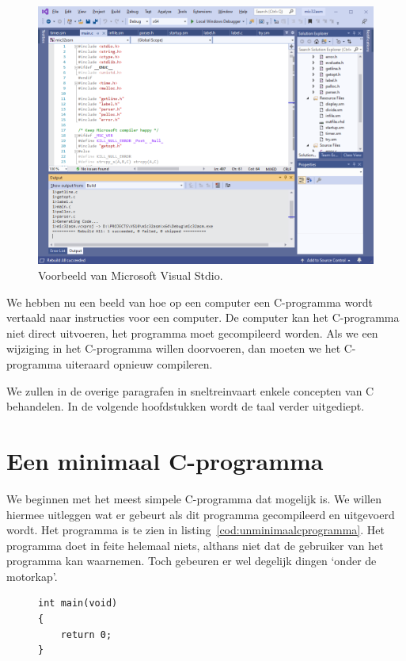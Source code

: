 \begin{figure}[!ht]
\centering
\includegraphics[width=\textwidth]{images/vs2019}
\caption{Voorbeeld van Microsoft Visual Stdio.}
\label{fig:unvs2019}
\end{figure}

We hebben nu een beeld van hoe op een computer een C-programma wordt vertaald naar instructies voor een computer. De computer kan het C-programma niet direct uitvoeren, het programma moet gecompileerd worden. Als we een wijziging in het C-programma willen doorvoeren, dan moeten we het C-programma uiteraard opnieuw compileren.

We zullen in de overige paragrafen in sneltreinvaart enkele concepten van C behandelen. In de volgende hoofdstukken wordt de taal verder uitgediept.


\section{Een minimaal C-programma}
We beginnen met het meest simpele C-programma dat mogelijk is. We willen hiermee uitleggen wat er gebeurt als dit programma gecompileerd en uitgevoerd wordt. Het programma is te zien in listing~\ref{cod:unminimaalcprogramma}. Het programma doet in feite helemaal niets, althans niet dat de gebruiker van het programma kan waarnemen. Toch gebeuren er wel degelijk dingen `onder de motorkap'.

\begin{figure}[H]
\begin{lstlisting}[caption=Een minimaal C-programma.,label=cod:unminimaalcprogramma]
int main(void)
{
	return 0;
}
\end{lstlisting}
\end{figure}

